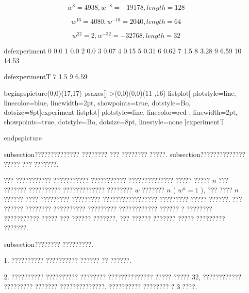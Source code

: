 \documentclass[11pt]{article} %
\begin{document}
$$w^{8}=4938, w^{-8}=-19178, length=128 $$

$$w^{16}=4080, w^{-16}=2040, length=64 $$

$$w^{32}=2, w^{-32}=-32768, length=32 $$


defexperiment{%
0 0.0
1 0.0
2 0.0
3 0.07
4 0.15
5 0.31
6 0.62
7 1.5
8 3.28
9 6.59
10 14.53
}%

defexperimentT{%
7 1.5
9 6.59
}%

begin{pspicture}(0,0)(17,17)
psaxes[]{->}(0,0)(0,0)(11 ,16) %
listplot[ plotstyle=line, linecolor=blue, linewidth=2pt, showpoints=true, dotstyle=Bo, dotsize=8pt]{experiment} %
listplot[ plotstyle=line, linecolor=red , linewidth=2pt, showpoints=true, dotstyle=Bo, dotsize=8pt, linestyle=none ]{experimentT} %

end{pspicture}







subsection{?????????????? ???????? ??? ???????? ?????.}
subsection{?????????????? ????? ??? ???????.}

??? ??????????? ??????????? ??????????? ?????????????? ????? ????? $n$ ??? ??????? ?????????? ????????????? ???????? $w$ ??????? $n$ ( $w^n = 1$ ),
??? ???? $n$ ?????? ???? ????????? ????????? ????????????????? ????????? ????? ??????. ??? ?????? ???????? ?????????? ????????? ????????????
?????? ? ???????? ??????????? ????? ??? ?????? ???????, ??? ?????? ??????? ????? ????????? ???????.

subsection{???????? ?????????.}

1. ?????????? ?????????? ?????? ?? ??????.

2. ?????????? ?????????? ???????? ?????????????? ????? ????? 32, ???????????? ????????? ??????? ??????????????. ?????????? ???????? ? 3 ????.
\end{document}
